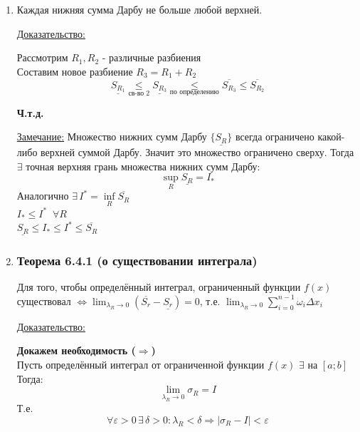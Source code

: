 \documentclass[12pt]{article}
\begin{document}
\begin{enumerate}
\begin{adjustwidth}{1.5em}{1.5em}
\begin{center}
            \end{center}
        \end{adjustwidth}
        \item Каждая нижняя сумма Дарбу не больше любой верхней.\par\noindent
        \underline{Доказательство:}
        \begin{adjustwidth}{1.5em}{1.5em}
            Рассмотрим $R_1,R_2$ - различные разбиения\\
            Составим новое разбиение $R_3=R_1+R_2$\\
            \[\underline{S_{R_1}} \underset{\text{св-во 2}}{\leq} \underline{S_{R_3}} \underset{\text{по определению}}{\leq} \overline{S_{R_3}} \leq \overline{S_{R_2}}\]
            \begin{center}
                \textbf{Ч.т.д.}
            \end{center}
        \end{adjustwidth}\noindent
        \underline{Замечание:} Множество нижних сумм Дарбу $\{\underline{S_R}\}$ всегда ограничено какой-либо верхней суммой Дарбу. Значит это множество ограничено сверху. Тогда $\exists$ точная верхняя грань множества нижних сумм Дарбу:
        \[ \underset{R}{\sup} \underline{S_R} = I_* \]
        Аналогично $\exists\,I^* = \underset{R}{\inf} \overline{S_R}$\\
        $I_* \leq I^* \;\; \forall R$\\
        $\underline{S_R} \leq I_* \leq I^* \leq \overline{S_R}$
        \item \subsubsection*{Теорема 6.4.1 (о существовании интеграла)}\label{th:6.4.1}
        Для того, чтобы определённый интеграл, ограниченный функции $f(x)$ существовал $\Longleftrightarrow \lim_{\lambda_R \to 0} (\overline{S_r}- \underline{S_r})=0$,
        т.е. $\lim_{\lambda_R \to 0}\sum_{i=0}^{n-1} \omega_i \Delta x_i$ \par\noindent
        \underline{Доказательство:}
        \begin{adjustwidth}{1.5em}{1.5em}
            \textbf{Докажем необходимость ($\Rightarrow$)}\\
            Пусть определённый интеграл от ограниченной функции $f(x)$ $\exists$ на $[a;b]$\\
            Тогда:
            \[ \lim_{\lambda_R \to 0} \sigma_R = I\]
            Т.е. 
            \[ \forall \varepsilon > 0\,\exists\,\delta > 0: \lambda_R < \delta \Rightarrow |\sigma_R - I| < \varepsilon \]

\end{adjustwidth}
\end{enumerate}
\end{document}
